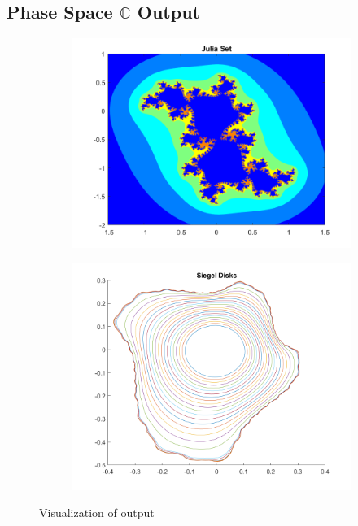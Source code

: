 \documentclass{article}
\newcommand{\C}{\mathbb{C}}
\theoremstyle{plain}
\theoremstyle{remark}
\begin{document}
\subsection{Phase Space $\C$ Output}

\begin{figure}[h!]
\begin{subfigure}{.5\textwidth}
\includegraphics[width=1.2\linewidth]{siegel_julia_set}
\end{subfigure}
\begin{subfigure}{.5\textwidth}
\includegraphics[width=1.1\linewidth]{siegel_disk}
\end{subfigure}
\caption{Visualization of output}
\end{figure}
\end{document}
